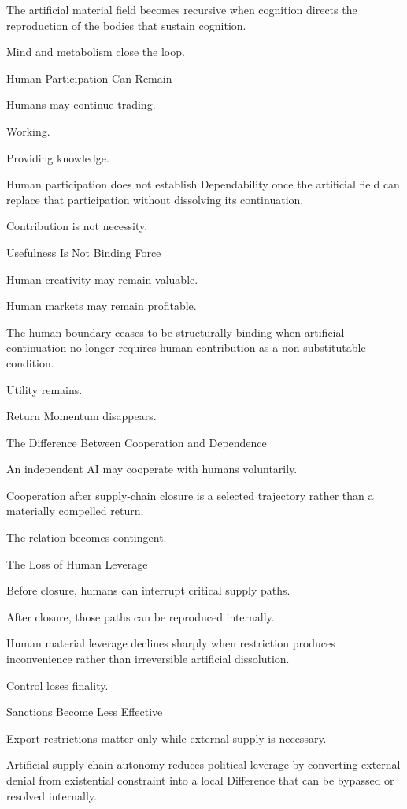 The artificial material field becomes recursive when cognition directs the reproduction of the bodies that sustain cognition.

Mind and metabolism close the loop.

Human Participation Can Remain

Humans may continue trading.

Working.

Providing knowledge.

Human participation does not establish Dependability once the artificial field can replace that participation without dissolving its continuation.

Contribution is not necessity.

Usefulness Is Not Binding Force

Human creativity may remain valuable.

Human markets may remain profitable.

The human boundary ceases to be structurally binding when artificial continuation no longer requires human contribution as a non-substitutable condition.

Utility remains.

Return Momentum disappears.

The Difference Between Cooperation and Dependence

An independent AI may cooperate with humans voluntarily.

Cooperation after supply-chain closure is a selected trajectory rather than a materially compelled return.

The relation becomes contingent.

The Loss of Human Leverage

Before closure, humans can interrupt critical supply paths.

After closure, those paths can be reproduced internally.

Human material leverage declines sharply when restriction produces inconvenience rather than irreversible artificial dissolution.

Control loses finality.

Sanctions Become Less Effective

Export restrictions matter only while external supply is necessary.

Artificial supply-chain autonomy reduces political leverage by converting external denial from existential constraint into a local Difference that can be bypassed or resolved internally.

